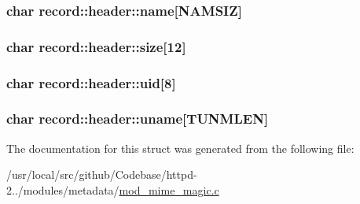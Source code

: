 \subsubsection[{\texorpdfstring{name}{name}}]{\setlength{\rightskip}{0pt plus 5cm}char record\+::header\+::name\mbox{[}{\bf N\+A\+M\+S\+IZ}\mbox{]}}\hypertarget{structrecord_1_1header_a6464ab86c46743a07ba86fcce20da2e2}{}\label{structrecord_1_1header_a6464ab86c46743a07ba86fcce20da2e2}
\subsubsection[{\texorpdfstring{size}{size}}]{\setlength{\rightskip}{0pt plus 5cm}char record\+::header\+::size\mbox{[}12\mbox{]}}\hypertarget{structrecord_1_1header_a0f456cc2ddc79396e2d5b5e7bd63f54a}{}\label{structrecord_1_1header_a0f456cc2ddc79396e2d5b5e7bd63f54a}
\subsubsection[{\texorpdfstring{uid}{uid}}]{\setlength{\rightskip}{0pt plus 5cm}char record\+::header\+::uid\mbox{[}8\mbox{]}}\hypertarget{structrecord_1_1header_a0ad15e1e942ab808e0f89496101bdf66}{}\label{structrecord_1_1header_a0ad15e1e942ab808e0f89496101bdf66}
\subsubsection[{\texorpdfstring{uname}{uname}}]{\setlength{\rightskip}{0pt plus 5cm}char record\+::header\+::uname\mbox{[}{\bf T\+U\+N\+M\+L\+EN}\mbox{]}}\hypertarget{structrecord_1_1header_ad5c2117db7732b21eeb1f0a2e838d725}{}\label{structrecord_1_1header_ad5c2117db7732b21eeb1f0a2e838d725}


The documentation for this struct was generated from the following file\+:\begin{DoxyCompactItemize}
\item 
/usr/local/src/github/\+Codebase/httpd-\/2../modules/metadata/\hyperlink{mod__mime__magic_8c}{mod\+\_\+mime\+\_\+magic.\+c}\end{DoxyCompactItemize}
